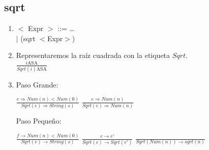\documentclass{article}
\begin{document}
\subsection*{sqrt}
\begin{enumerate}[label = (\alph*)]
    \item $<$ Expr $>$ ::= \ldots \\
          $|$ (sqrt $<$Expr$>$)

    
    \item Representaremos la raíz cuadrada con la etiqueta $Sqrt$.\\
    $\frac{i\text{ASA}}{Sqrt(i)\text{ASA}}$

    \item Paso Grande: \begin{center}
        $\frac{e\Rightarrow Num(n)<Num(0)}{Sqrt(e)\Rightarrow String(s)}$
        $\frac{e\Rightarrow Num(n)}{Sqrt(e)\Rightarrow Num(n)}$
    \end{center}
    
    Paso Pequeño: \begin{center}
        $\frac{f\rightarrow Num(n)<Num(0)}{Sqrt(e)\rightarrow String(s)}$
        $\frac{e\rightarrow e'}{Sqrt(e)\rightarrow Sqrt(e')}$
        $\frac{}{Sqrt(Num(n))\rightarrow sqrt(n)}$
    \end{center}
\end{enumerate}
\end{document}
